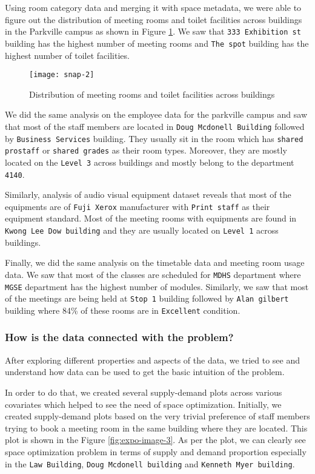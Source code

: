 Using room category data and merging it with space metadata, we were able to figure out the distribution of meeting rooms and toilet facilities across buildings in the Parkville campus as shown in Figure \ref{fig:expo-image-2}. We saw that \texttt{333 Exhibition st} building has the highest number of meeting rooms and \texttt{The spot} building has the highest number of toilet facilities.

\begin{figure}[H]
\centering
\texttt{[image: snap-2]}
\caption{Distribution of meeting rooms and toilet facilities across buildings}
\label{fig:expo-image-2}
\end{figure}

We did the same analysis on the employee data for the parkville campus and saw that most of the staff members are located in \texttt{Doug Mcdonell Building} followed by \texttt{Business Services} building. They usually sit in the room which has \texttt{shared prostaff} or \texttt{shared grades} as their room types. Moreover, they are mostly located on the \texttt{Level 3} across buildings and mostly belong to the department \texttt{4140}.

Similarly, analysis of audio visual equipment dataset reveals that most of the equipments are of \texttt{Fuji Xerox} manufacturer with \texttt{Print staff} as their equipment standard. Most of the meeting rooms with equipments are found in \texttt{Kwong Lee Dow building} and they are usually located on \texttt{Level 1} across buildings.

Finally, we did the same analysis on the timetable data and meeting room usage data. We saw that most of the classes are scheduled for \texttt{MDHS} department where \texttt{MGSE} department has the highest number of modules. Similarly, we saw that most of the meetings are being held at \texttt{Stop 1} building followed by \texttt{Alan gilbert} building where 84\% of these rooms are in \texttt{Excellent} condition.

\subsubsection{How is the data connected with the problem?}

After exploring different properties and aspects of the data, we tried to see and understand how data can be used to get the basic intuition of the problem.

In order to do that, we created several supply-demand plots across various covariates which helped to see the need of space optimization. Initially, we created supply-demand plots based on the very trivial preference of staff members trying to book a meeting room in the same building where they are located. This plot is shown in the Figure \ref{fig:expo-image-3}. As per the plot, we can clearly see space optimization problem in terms of supply and demand proportion especially in the \texttt{Law Building}, \texttt{Doug Mcdonell building} and \texttt{Kenneth Myer building}.

